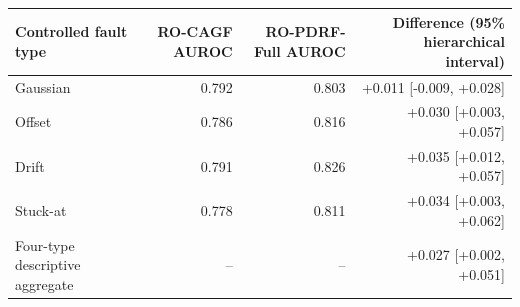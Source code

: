 \begin{tabular}{lrrr}
\toprule
Controlled fault type & RO-CAGF AUROC & RO-PDRF-Full AUROC & Difference (95\% hierarchical interval) \\
\midrule
Gaussian & 0.792 & 0.803 & +0.011 [-0.009, +0.028] \\
Offset & 0.786 & 0.816 & +0.030 [+0.003, +0.057] \\
Drift & 0.791 & 0.826 & +0.035 [+0.012, +0.057] \\
Stuck-at & 0.778 & 0.811 & +0.034 [+0.003, +0.062] \\
\midrule
Four-type descriptive aggregate & -- & -- & +0.027 [+0.002, +0.051] \\
\bottomrule
\end{tabular}